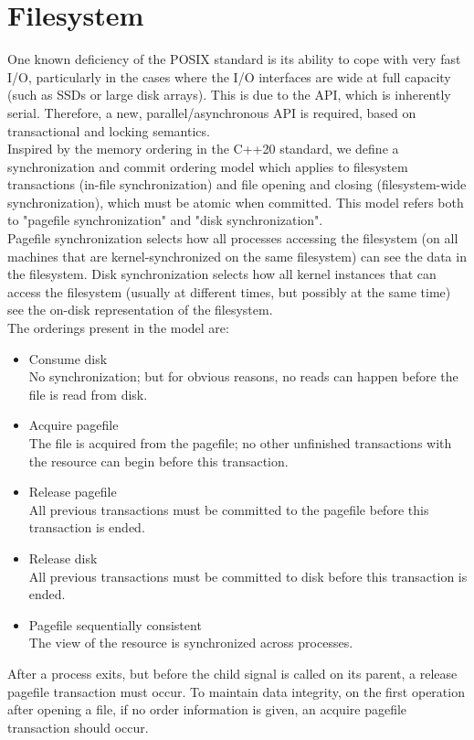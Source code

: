 \section{Filesystem}
One known deficiency of the POSIX standard is its ability to cope with very fast I/O, particularly in the cases where the I/O interfaces are wide at full capacity (such as SSDs or large disk arrays). This is due to the API, which is inherently serial. Therefore, a new, parallel/asynchronous API is required, based on transactional and locking semantics.\\
Inspired by the memory ordering in the C++20 standard, we define a synchronization and commit ordering model which applies to filesystem transactions (in-file synchronization) and file opening and closing (filesystem-wide synchronization), which must be atomic when committed. This model refers both to "pagefile synchronization" and "disk synchronization".\\
Pagefile synchronization selects how all processes accessing the filesystem (on all machines that are kernel-synchronized on the same filesystem) can see the data in the filesystem. Disk synchronization selects how all kernel instances that can access the filesystem (usually at different times, but possibly at the same time) see the on-disk representation of the filesystem.\\
The orderings present in the model are:
\begin{itemize}
	\item Consume disk\\
	No synchronization; but for obvious reasons, no reads can happen before the file is read from disk.
	\item Acquire pagefile\\
	The file is acquired from the pagefile; no other unfinished transactions with the resource can begin before this transaction.
	\item Release pagefile\\
	All previous transactions must be committed to the pagefile before this transaction is ended.
	\item Release disk\\
	All previous transactions must be committed to disk before this transaction is ended.
	\item Pagefile sequentially consistent\\
	The view of the resource is synchronized across processes.
\end{itemize}
After a process exits, but before the child signal is called on its parent, a release pagefile transaction must occur. To maintain data integrity, on the first operation after opening a file, if no order information is given, an acquire pagefile transaction should occur.\\
